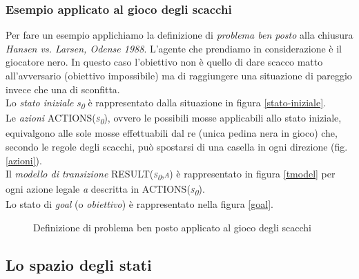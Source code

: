 \subsubsection*{Esempio applicato al gioco degli scacchi}
Per fare un esempio applichiamo la definizione di \emph{problema ben posto} alla chiusura \emph{Hansen vs. Larsen, Odense 1988}.
L'agente che prendiamo in considerazione è il giocatore nero.
In questo caso l'obiettivo non è quello di dare scacco matto all'avversario (obiettivo impossibile) ma di raggiungere una situazione di pareggio invece che una di sconfitta.\\
Lo \emph{stato iniziale} \emph{s\textsubscript{0}} è rappresentato dalla situazione in figura \ref{stato-iniziale}.\\
Le \emph{azioni} \textsc{ACTIONS(\emph{s\textsubscript{0}})}, ovvero le possibili mosse applicabili allo stato iniziale, equivalgono alle sole mosse effettuabili dal re (unica pedina nera in gioco) che, secondo le regole degli scacchi, può spostarsi di una casella in ogni direzione (fig. \ref{azioni}).\\
Il \emph{modello di transizione} \textsc{RESULT(\emph{s\textsubscript{0}},\emph{a})} è rappresentato in figura \ref{tmodel} per ogni azione legale \emph{a} descritta in \textsc{ACTIONS(\emph{s\textsubscript{0}})}.\\
Lo stato di \emph{goal} (o \emph{obiettivo}) è rappresentato nella figura \ref{goal}.
\begin{figure}[!htb]
\centering
{}


\caption{Definizione di problema ben posto applicato al gioco degli scacchi}
\label{fig:scacchi-ben-posti}
\end{figure}







\subsection{Lo spazio degli stati}

